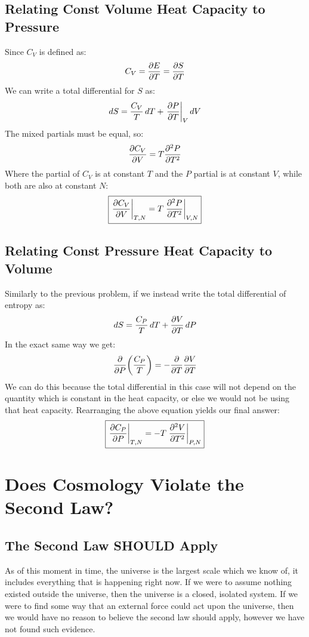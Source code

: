 \documentclass[12pt]{article}
\begin{document}
\subsection{Relating Const Volume Heat Capacity to Pressure}
Since $C_V$ is defined as:
\begin{align*}
  C_V=\pdv{E}{T}=\pdv{S}{T}
\end{align*}
We can write a total differential for $S$ as:
\begin{align*}
  \dd{S}=\frac{C_V}{T}\dd{T}+\eval{\pdv{P}{T}}_V\dd{V}
\end{align*}
The mixed partials must be equal, so:
\begin{align*}
  \pdv{C_V}{V}=T\pdv[2]{P}{T}
\end{align*}
Where the partial of $C_V$ is at constant $T$ and the $P$ partial is at constant $V$, while both are also at constant $N$:
\begin{align}
  \boxed{\eval{\pdv{C_V}{V}}_{T,N}=T\eval{\pdv[2]{P}{T}}_{V,N}}
\end{align}
\subsection{Relating Const Pressure Heat Capacity to Volume}
Similarly to the previous problem, if we instead write the total differential of entropy as:
\begin{align*}
  \dd{S}=\frac{C_P}{T}\dd{T}+\pdv{V}{T}\dd{P}
\end{align*}
In the exact same way we get:
\begin{align*}
  \pdv{P}\qty(\frac{C_P}{T})=-\pdv{T}\pdv{V}{T}
\end{align*}
We can do this because the total differential in this case will not depend on the quantity which is constant in the heat capacity, or else we would not be using that heat capacity. Rearranging the above equation yields our final answer:
\begin{align}
  \boxed{\eval{\pdv{C_P}{P}}_{T,N}=-T\eval{\pdv[2]{V}{T}}_{P,N}}
\end{align}
\newpage
\section{Does Cosmology Violate the Second Law?}
\subsection{The Second Law SHOULD Apply}
As of this moment in time, the universe is the largest scale which we know of, it includes everything that is happening right now. If we were to assume nothing existed outside the universe, then the universe is a closed, isolated system. If we were to find some way that an external force could act upon the universe, then we would have no reason to believe the second law should apply, however we have not found such evidence. 
\end{document}
